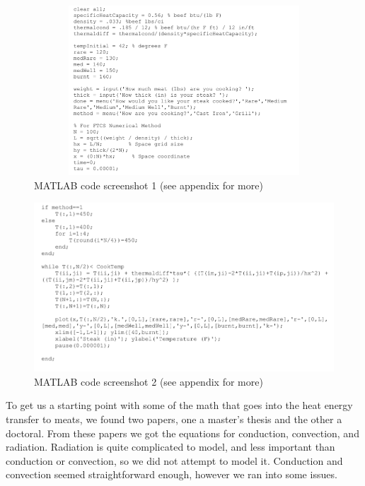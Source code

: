 \documentclass[12pt]{article}
\begin{document}
%
%
%
\begin{figure}[htb] %
\label{code1}
\begin{center}
\includegraphics[keepaspectratio=true, width=6.5in, height=2.5in]{code1.png}
\caption{MATLAB code screenshot 1 (see appendix for more)}
\end{center}
\end{figure}

\begin{figure}[htb] %
\label{code2}
\begin{center}
\includegraphics[keepaspectratio=true, width=6.5in, height=2.5in]{code2.png}
\caption{MATLAB code screenshot 2 (see appendix for more)}
\end{center}
\end{figure}

%
%
%




%
%
%
%
To get us a starting point with some of the math that goes into the heat energy transfer to meats, we found two papers, one a master's thesis and the other a doctoral. From these papers we got the equations for conduction, convection, and radiation. Radiation is quite complicated to model, and less important than conduction or convection, so we did not attempt to model it. Conduction and convection seemed straightforward enough, however we ran into some issues.
\end{document}
